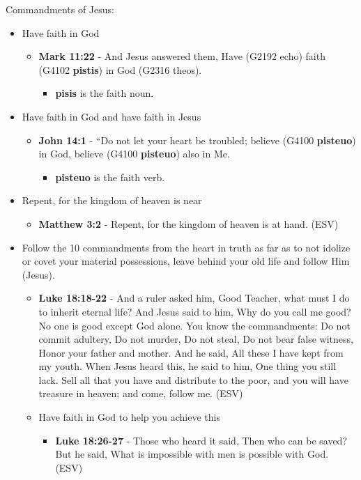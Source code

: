 \documentclass[11pt]{article}
\begin{document}
Commandments of Jesus:
\begin{itemize}
\item Have faith in God
\begin{itemize}
\item \textbf{Mark 11:22} - And Jesus answered them, Have (G2192 echo) faith (G4102 \textbf{pistis}) in God (G2316 theos).
\begin{itemize}
\item \textbf{pisis} is the faith noun.
\end{itemize}
\end{itemize}
\item Have faith in God and have faith in Jesus
\begin{itemize}
\item \textbf{John 14:1} - “Do not let your heart be troubled; believe (G4100 \textbf{pisteuo}) in God, believe (G4100 \textbf{pisteuo}) also in Me.
\begin{itemize}
\item \textbf{pisteuo} is the faith verb.
\end{itemize}
\end{itemize}
\item Repent, for the kingdom of heaven is near
\begin{itemize}
\item \textbf{Matthew 3:2} - Repent, for the kingdom of heaven is at hand. (ESV)
\end{itemize}
\item Follow the 10 commandments from the heart in truth as far as to not idolize or covet your material possessions, leave behind your old life and follow Him (Jesus). 
\begin{itemize}
\item \textbf{Luke 18:18-22} - And a ruler asked him, Good Teacher, what must I do to inherit eternal life? And Jesus said to him, Why do you call me good? No one is good except God alone. You know the commandments: Do not commit adultery, Do not murder, Do not steal, Do not bear false witness, Honor your father and mother. And he said, All these I have kept from my youth. When Jesus heard this, he said to him, One thing you still lack. Sell all that you have and distribute to the poor, and you will have treasure in heaven; and come, follow me. (ESV)
\item Have faith in God to help you achieve this
\begin{itemize}
\item \textbf{Luke 18:26-27} - Those who heard it said, Then who can be saved? But he said, What is impossible with men is possible with God. (ESV)

\end{itemize}
\end{itemize}
\end{itemize}
\end{document}
